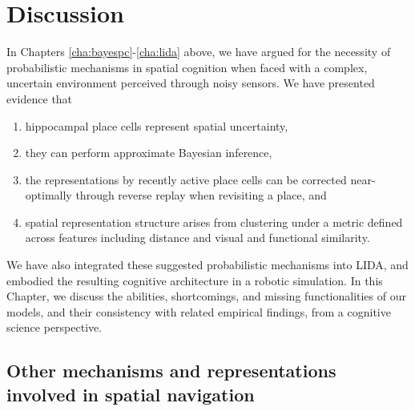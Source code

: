 \chapter{Discussion}
\label{cha:discussion}

In Chapters \ref{cha:bayespc}-\ref{cha:lida} above, we have argued for the necessity of probabilistic mechanisms in spatial cognition when faced with a complex, uncertain environment perceived through noisy sensors. We have presented evidence that

\begin{enumerate}
	\item hippocampal place cells represent spatial uncertainty, 
	\item they can perform approximate Bayesian inference,
	\item the representations by recently active place cells can be corrected near-optimally through reverse replay when revisiting a place, and
	\item spatial representation structure arises from clustering under a metric defined across features including distance and visual and functional similarity.
\end{enumerate}

We have also integrated these suggested probabilistic mechanisms into LIDA, and embodied the resulting cognitive architecture in a robotic simulation. In this Chapter, we discuss the abilities, shortcomings, and missing functionalities of our models, and their consistency with related empirical findings, from a cognitive science perspective. 


\section{Other mechanisms and representations involved in spatial navigation}


